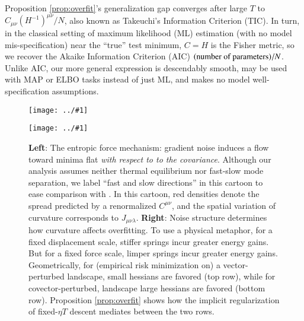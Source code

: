 \documentclass{article}
\newcommand{\plotmooh}[3]{
    \texttt{[image: ../\#1]}
}
\begin{document}
        Proposition \ref{prop:overfit}'s generalization gap converges after
        large $T$ to $C_{\mu\nu}(H^{-1})^{\mu\nu}/N$, also known as Takeuchi's
        Information Criterion (TIC).  In turn, in the classical setting of
        maximum likelihood (ML) estimation (with no model mis-specification)
        near the ``true'' test minimum, $C=H$ is the Fisher metric, so we
        recover the Akaike Information Criterion (AIC) $(\textnormal{number of
        parameters})/N$.  Unlike AIC, our more general expression is
        descendably smooth, may be used with MAP or ELBO tasks instead of just
        ML, and makes no model well-specification assumptions.

        \begin{figure}[h!]
            \centering
            \plotmooh{diagrams/entropic-force-diagram}{}{0.35\columnwidth} 
            \plotmooh{diagrams/springs}{}{0.35\columnwidth}
            \caption{
                {\bf Left}:
                    The entropic force mechanism: gradient noise induces a flow
                    toward minima flat \emph{with respect to to the
                    covariance}.  Although our analysis assumes neither thermal
                    equilibrium nor fast-slow mode separation, we label ``fast
                    and slow directions'' in this cartoon to ease comparison
                    with \citet{we19b}.  In this cartoon, red densities denote
                    the spread predicted by a renormalized $C^{\mu\nu}$, and
                    the spatial variation of curvature corresponds to
                    $J_{\mu\nu\lambda}$. 
                {\bf Right}:
                    Noise structure determines how curvature affects
                    overfitting.  To use a physical metaphor, for a fixed
                    displacement scale, stiffer springs incur greater energy
                    gains.  But for a fixed force scale, limper springs incur
                    greater energy gains.  Geometrically, for (empirical risk
                    minimization on) a vector-perturbed landscape, small
                    hessians are favored (top row), while for
                    covector-perturbed, landscape large hessians are favored
                    (bottom row).  Proposition \ref{prop:overfit} shows how the
                    implicit regularization of fixed-$\eta T$ descent mediates
                    between the two rows.
            }
            \label{fig:entropic}
        \end{figure}
\end{document}
